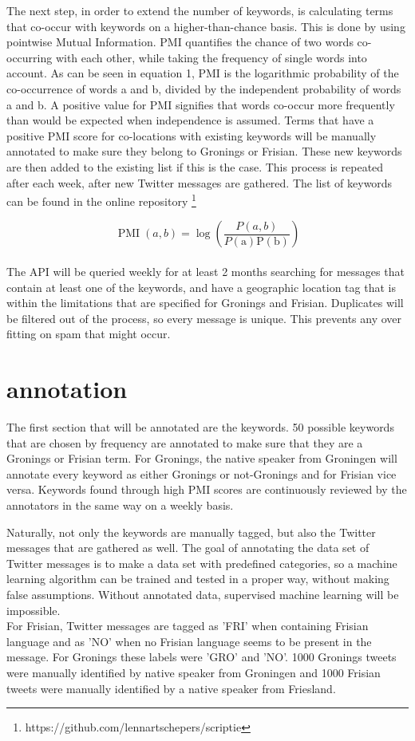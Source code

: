 \documentclass[
10pt, %
a4paper, %
oneside, %
headinclude,footinclude, %
] {book}%
\begin{document}
The next step, in order to extend the number of keywords, is calculating terms that co-occur with keywords on a higher-than-chance basis. This is done by using pointwise Mutual Information. PMI quantifies the chance of two words co-occurring with each other, while taking the frequency of single words into account. As can be seen in equation 1, PMI is the logarithmic probability of the co-occurrence of words a and b, divided by the independent probability of words a and b. A positive value for PMI signifies that words co-occur more frequently than would be expected when independence is assumed. Terms that have a positive PMI score for co-locations with existing keywords will be manually annotated to make sure they belong to Gronings or Frisian. These new keywords are then added to the existing list if this is the case. This process is repeated after each week, after new Twitter messages are gathered. The list of keywords can be found in the online repository \footnote{https://github.com/lennartschepers/scriptie}

\begin{equation}
\operatorname{PMI}(a, b)=\log \left(\frac{P(a, b)}{P(\mathrm{a}) \mathrm{P}(\mathrm{b})}\right)
\end{equation}
\\

The API will be queried weekly for at least 2 months searching for messages that contain at least one of the keywords, and have a geographic location tag that is within the limitations that are specified for Gronings and Frisian. Duplicates will be filtered out of the process, so every message is unique. This prevents any over fitting on spam that might occur.


\section{annotation}
The first section that will be annotated are the keywords. 50 possible keywords that are chosen by frequency are annotated to make sure that they are a Gronings or Frisian term. For Gronings, the native speaker from Groningen will annotate every keyword as either Gronings or not-Gronings and for Frisian vice versa. Keywords found through high PMI scores are continuously reviewed by the annotators in the same way on a weekly basis.

Naturally, not only the keywords are manually tagged, but also the Twitter messages that are gathered as well. The goal of annotating the data set of Twitter messages is to make a data set with predefined categories, so a machine learning algorithm can be trained and tested in a proper way, without making false assumptions. Without annotated data, supervised machine learning will be impossible.  \\
For Frisian, Twitter messages are tagged as 'FRI' when containing Frisian language and as 'NO' when no Frisian language seems to be present in the message. For Gronings these labels were 'GRO' and 'NO'. 1000 Gronings tweets were manually identified by native speaker from Groningen and 1000 Frisian tweets were manually identified by a native speaker from Friesland. \\
\end{document}
